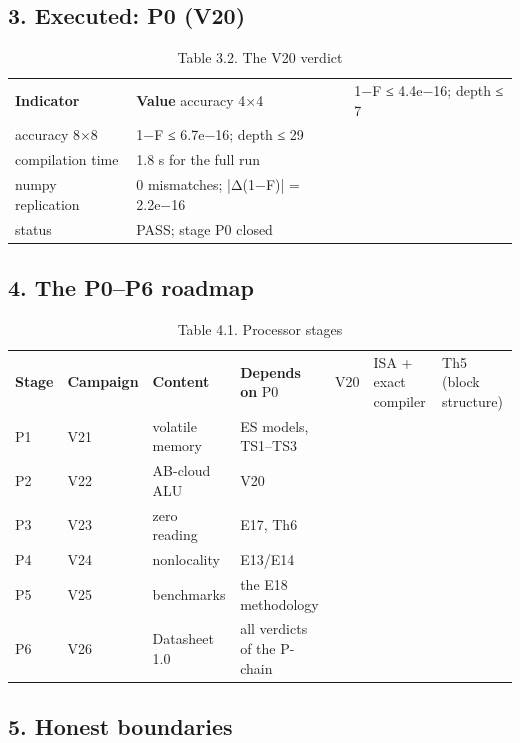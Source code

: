 \documentclass[11pt,a4paper]{article}
\begin{document}
\subsection{3. Executed: P0 (V20)}

\begin{table}[htbp]\centering\small
\caption{Table 3.2. The V20 verdict}
\begin{tabular}{p{} p{}}
\toprule
\textbf{Indicator} & \textbf{Value}
\midrule
accuracy 4×4 & 1−F ≤ 4.4e−16; depth ≤ 7 \\
accuracy 8×8 & 1−F ≤ 6.7e−16; depth ≤ 29 \\
compilation time & 1.8 s for the full run \\
numpy replication & 0 mismatches; |Δ(1−F)| = 2.2e−16 \\
status & PASS; stage P0 closed \\
\bottomrule
\end{tabular}
\end{table}

\subsection{4. The P0–P6 roadmap}

\begin{table}[htbp]\centering\small
\caption{Table 4.1. Processor stages}
\begin{tabular}{p{} p{} p{} p{}}
\toprule
\textbf{Stage} & \textbf{Campaign} & \textbf{Content} & \textbf{Depends on}
\midrule
P0 & V20 & ISA + exact compiler & Th5 (block structure) \\
P1 & V21 & volatile memory & ES models, TS1–TS3 \\
P2 & V22 & AB-cloud ALU & V20 \\
P3 & V23 & zero reading & E17, Th6 \\
P4 & V24 & nonlocality & E13/E14 \\
P5 & V25 & benchmarks & the E18 methodology \\
P6 & V26 & Datasheet 1.0 & all verdicts of the P-chain \\
\bottomrule
\end{tabular}
\end{table}

\subsection{5. Honest boundaries}
\end{document}

